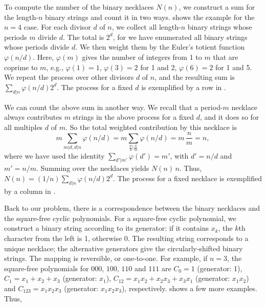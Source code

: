 \documentclass{ws-ijbc}
\begin{document}
To compute the number of the binary necklaces $N(n)$,
we construct a sum for the length-$n$ binary strings and count it in two ways.
 shows the example for the $n=4$ case.
%
For each divisor $d$ of $n$, we collect
  all length-$n$ binary strings
  whose periods $m$ divide $d$.
%
The total is $2^d$,
  for we have enumerated all binary strings whose periods divide $d$.
%
We then weight them by the Euler's totient function $\varphi(n/d)$.
%
Here, $\varphi(m)$ gives the number of integers from 1 to $m$
  that are coprime to $m$,
  e.g.,
  $\varphi(1) = 1$,
  $\varphi(3) = 2$ for 1 and 2,
  $\varphi(6) = 2$ for 1 and 5.
We repeat the process over other divisors $d$ of $n$,
  and the resulting sum is $\sum_{d|n} \varphi(n/d) 2^d$.
%
The process for a fixed $d$ is exemplified
  by a row in .

%


We can count the above sum in another way.
We recall that a period-$m$ necklace always contributes
  $m$ strings in the above process for a fixed $d$,
  and it does so for all multiples $d$ of $m$.
So the total weighted contribution by this necklace is
\begin{equation}
m \sum_{m|d, d|n} \varphi(n/d) =
 m \sum_{\frac{n}{d}|\frac{n}{m}} \varphi(n/d) = m \,  \frac{n}{m}  = n,
\label{eq:mphind}
\end{equation}
where we have used the identity $\sum_{d'|m'} \varphi(d') = m'$,
with $d' = n/d$ and $m' = n/m$.
%
Summing over the necklaces yields $N(n) \, n$. Thus,
$N(n) = (1/n) \sum_{d|n} \varphi(n/d) 2^d$.
The process for a fixed necklace is exemplified
  by a column in .
%


Back to our problem, there is
  a correspondence between the binary necklaces
  and the square-free cyclic polynomials.
For a square-free cyclic polynomial,
  we construct a binary string according to its generator:
if it contains $x_k$, the $k$th character from the left is 1,
  otherwise 0.
The resulting string corresponds to a unique necklace;
  the alternative generators give
  the circularly-shifted binary strings.
The mapping is reversible, or one-to-one.
For example, if $n = 3$,
 the square-free polynomials for $000$, $100$, $110$ and $111$ are
  $C_0 = 1$ (generator: 1),
  $C_1 = x_1 + x_2 + x_3$ (generator: $x_1$),
  $C_{12} = x_1 x_2 + x_2 x_3 + x_3 x_1$ (generator: $x_1 x_2$)
  and $C_{123} = x_1 x_2 x_3$ (generator: $x_1 x_2 x_3$), respectively.
 shows a few more examples.
%
Thus,
\end{document}
